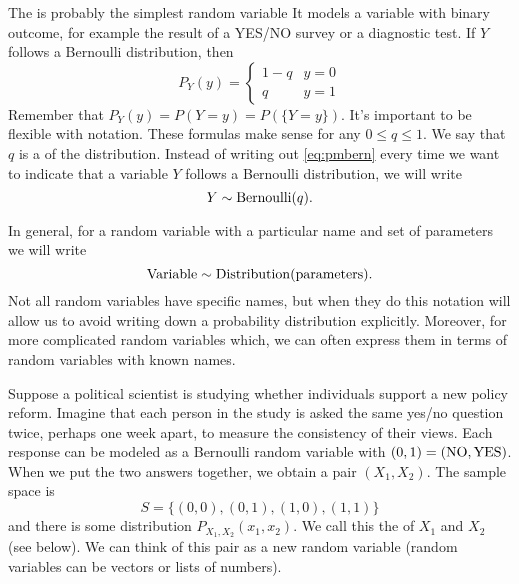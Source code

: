 \begin{example}  The  \cite[Example 2.3.2]{evans} is probably the simplest random variable It models a variable with binary outcome, for example the result of a YES/NO survey or a diagnostic test. 
If $Y$ follows a Bernoulli distribution, then 
\begin{equation}\label{eq:pmbern}
P_Y(y) = \left\{\begin{array}{lr} 1-q & y=0\\ q & y= 1 \end{array}\right.
\end{equation}
Remember that $P_Y(y) = P(Y=y) = P(\{Y = y\})$. It's important to be flexible with notation. 
 These formulas make sense for any $0\le q\le1$. We say that $q$ is a  of the distribution. 
Instead of writing out \eqref{eq:pmbern} every time we want to indicate that a variable $Y$ follows a Bernoulli distribution, we will write 
\begin{equation*}
Y \sim {\rm Bernoulli}(q). 
\end{equation*}
\end{example}

  In general, for a random variable with a particular name and set of parameters we will write 
\begin{equation*}
{\rm Variable} \sim {\rm Distribution}({\rm parameters}).
\end{equation*}
Not all random variables have specific names, but when they do this notation will allow us to avoid writing down a probability distribution explicitly. Moreover, for more complicated random variables which, we can often express them in terms of random variables with known names. 


\begin{example}\label{ex:joint}
Suppose a political scientist is studying whether individuals support a new policy reform. 
Imagine that each person in the study is asked the same yes/no question twice, perhaps one week apart, to measure the consistency of their views. 
Each response can be modeled as a Bernoulli random variable with $(0,1) = ({\rm NO},{\rm YES})$. 
When we put the two answers together, we obtain a pair $(X_1, X_2)$. The sample space is 
\begin{equation}
S = \{(0,0),(0,1),(1,0),(1,1)\}
\end{equation}
and there is some distribution $P_{X_1,X_2}(x_1,x_2)$. We call this the  of $X_1$ and $X_2$ (see below).  We can think of this pair as a new random variable (random variables can be vectors or lists of numbers). 
\end{example}





